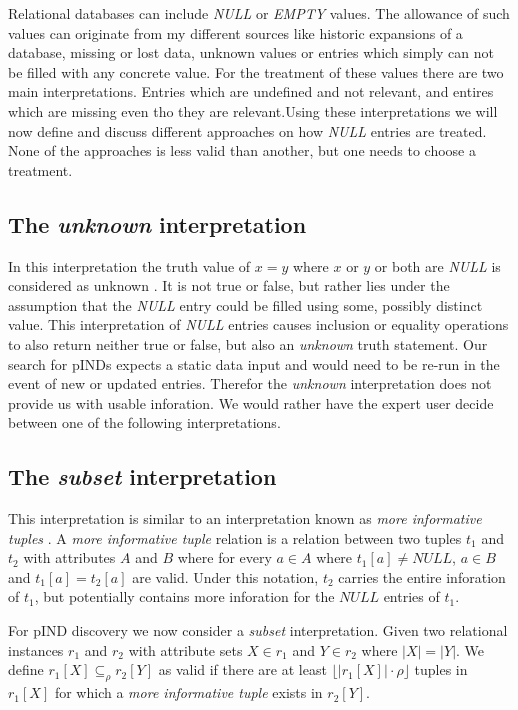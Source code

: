 
Relational databases can include \textit{NULL} or \textit{EMPTY} values.
The allowance of such values can originate from my different sources like historic expansions of a database, missing or lost data, unknown values or entries which simply can not be filled with any concrete value. For the treatment of these values there are two main interpretations. %
Entries which are undefined and not relevant, and entires which are missing even tho they are relevant.Using these interpretations we will now define and discuss different approaches on how \textit{NULL} entries are treated. None of the approaches is less valid than another, but one needs to choose a treatment.

\subsection*{The \textit{unknown} interpretation}
In this interpretation the truth value of $x = y$ where $x$ or $y$ or both are \textit{NULL} is considered as unknown \cite{codd1979extending}.
It is not true or false, but rather lies under the assumption that the \textit{NULL} entry could be filled using some,
possibly distinct value. This interpretation of \textit{NULL} entries causes inclusion or equality operations to also
return neither true or false, but also an \textit{unknown} truth statement.
Our search for pINDs expects a static data input and would need to be re-run in the event of new or updated entries.
Therefor the \textit{unknown} interpretation does not provide us with usable inforation. We would rather have the
expert user decide between one of the following interpretations.

\subsection*{The \textit{subset} interpretation}
This interpretation is similar to an interpretation known as \textit{more informative tuples} \cite{zaniolo1982database}.
A \textit{more informative tuple} relation is a relation between two tuples $t_1$ and $t_2$ with attributes $A$ and $B$
where for every $a \in A$ where $t_1[a] \not = NULL$, $a \in B$ and $t_1[a] = t_2[a]$ are valid. Under this notation,
$t_2$ carries the entire inforation of $t_1$, but potentially contains more inforation for the $NULL$ entries of $t_1$.

For pIND discovery we now consider a \textit{subset} interpretation. Given two relational instances $r_1$ and $r_2$ with attribute sets
$X \in r_1$ and $Y \in r_2$ where $|X| = |Y|$. We define $r_1[X] \subseteq_\rho r_2[Y]$ as valid if there are at least $\lfloor |r_1[X]| \cdot \rho \rfloor$
tuples in $r_1[X]$ for which a \textit{more informative tuple} exists in $r_2[Y]$.

